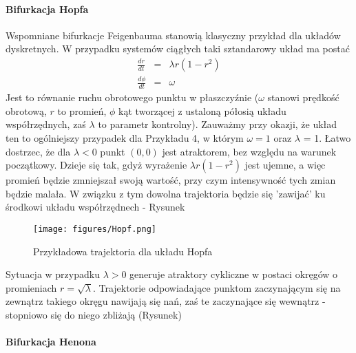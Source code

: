 \documentclass[12pt]{article}
\begin{document}
\paragraph{Bifurkacja Hopfa}
Wspomniane bifurkacje Feigenbauma stanowią klasyczny przykład dla układów dyskretnych. W przypadku systemów ciągłych taki sztandarowy układ ma postać
\begin{equation}
\begin{array}{rcl} 
\frac{dr}{dt} & = & \lambda r(1-r^2) \\ 
\frac{d\phi}{dt} & = & \omega
\end{array}
\end{equation}
Jest to równanie ruchu obrotowego punktu w płaszczyźnie ($ \omega $ stanowi prędkość obrotową, $ r $ to promień, $ \phi $ kąt tworzącej z ustaloną półosią układu współrzędnych, zaś $ \lambda  $ to parametr kontrolny). Zauważmy przy okazji, że układ ten to ogólniejszy przypadek dla Przykładu 4, w którym $ \omega = 1 $ oraz $ \lambda $ = 1.\newline
Łatwo dostrzec, że dla $ \lambda < 0 $ punkt $ (0,0) $ jest atraktorem, bez względu na warunek początkowy. Dzieje się tak, gdyż wyrażenie $ \lambda r(1-r^{2}) $ jest ujemne, a więc promień będzie zmniejszał swoją wartość, przy czym intensywność tych zmian będzie malała. W związku z tym dowolna trajektoria będzie się 'zawijać' ku środkowi układu współrzędnech - Rysunek
\begin{figure}[H]
	\texttt{[image: figures/Hopf.png]} 
	\centering
	\caption{Przykładowa trajektoria dla układu Hopfa}
\end{figure}
Sytuacja w przypadku $ \lambda >0 $ generuje atraktory cykliczne w postaci okręgów o promieniach $ r = \sqrt{\lambda} $. Trajektorie odpowiadające punktom zaczynającym się na zewnątrz takiego okręgu nawijają się nań, zaś te zaczynające się wewnątrz - stopniowo się do niego zbliżają (Rysunek)
\paragraph{Bifurkacja Henona}
\end{document}
